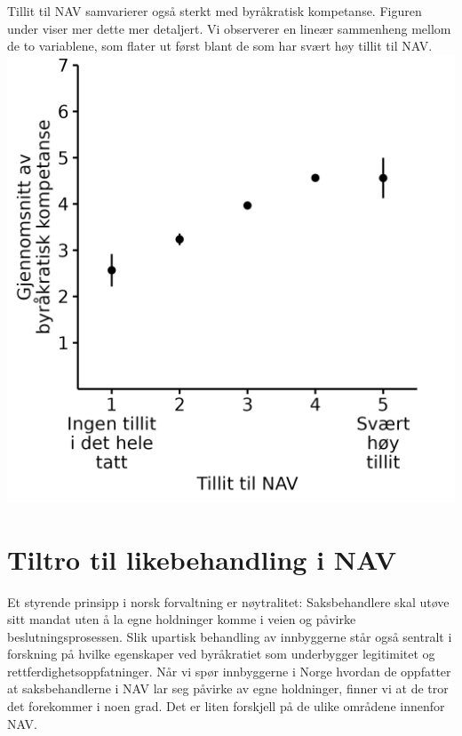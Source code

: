 \documentclass[
]{book}
\begin{document}
Tillit til NAV samvarierer også sterkt med byråkratisk kompetanse.
Figuren under viser mer dette mer detaljert.
Vi observerer en lineær sammenheng mellom de to variablene, som flater ut først blant de som har svært høy tillit til NAV.
\includegraphics{figs/png/fig_be_by_navtrust.png}

\hypertarget{tiltro-til-likebehandling-i-nav}{%
\section{Tiltro til likebehandling i NAV}\label{tiltro-til-likebehandling-i-nav}}

Et styrende prinsipp i norsk forvaltning er nøytralitet:
Saksbehandlere skal utøve sitt mandat uten å la egne holdninger komme i veien og påvirke beslutningsprosessen.
Slik upartisk behandling av innbyggerne står også sentralt i forskning på hvilke egenskaper ved byråkratiet som underbygger legitimitet og rettferdighetsoppfatninger.
Når vi spør innbyggerne i Norge hvordan de oppfatter at saksbehandlerne i NAV lar seg påvirke av egne holdninger, finner vi at de tror det forekommer i noen grad.
Det er liten forskjell på de ulike områdene innenfor NAV.
\end{document}
